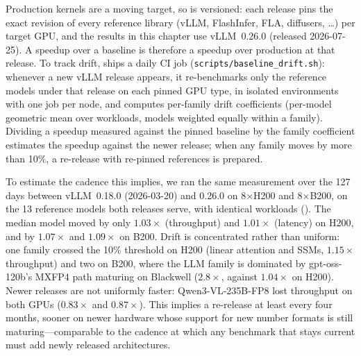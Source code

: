 Production kernels are a moving target, so \FastKernels is versioned: each release pins the exact revision of every reference library (vLLM, FlashInfer, FLA, diffusers, \dots) per target GPU, and the results in this chapter use vLLM~0.26.0 (released 2026-07-25).
A speedup over a \FastKernels baseline is therefore a speedup over production at that release.
To track drift, \FastKernels ships a daily CI job (\texttt{scripts/baseline\_drift.sh}): whenever a new vLLM release appears, it re-benchmarks only the reference models under that release on each pinned GPU type, in isolated environments with one job per node, and computes per-family drift coefficients (per-model geometric mean over workloads, models weighted equally within a family).
Dividing a speedup measured against the pinned baseline by the family coefficient estimates the speedup against the newer release; when any family moves by more than 10\%, a re-release with re-pinned references is prepared.

To estimate the cadence this implies, we ran the same measurement over the 127 days between vLLM~0.18.0 (2026-03-20) and 0.26.0 on 8$\times$H200 and 8$\times$B200, on the 13 reference models both releases serve, with identical workloads ().
The median model moved by only $1.03\times$ (throughput) and $1.01\times$ (latency) on H200, and by $1.07\times$ and $1.09\times$ on B200.
Drift is concentrated rather than uniform: one family crossed the 10\% threshold on H200 (linear attention and SSMs, $1.15\times$ throughput) and two on B200, where the LLM family is dominated by gpt-oss-120b's MXFP4 path maturing on Blackwell ($2.8\times$, against $1.04\times$ on H200).
Newer releases are not uniformly faster: Qwen3-VL-235B-FP8 lost throughput on both GPUs ($0.83\times$ and $0.87\times$).
This implies a re-release at least every four months, sooner on newer hardware whose support for new number formats is still maturing---comparable to the cadence at which any benchmark that stays current must add newly released architectures.

